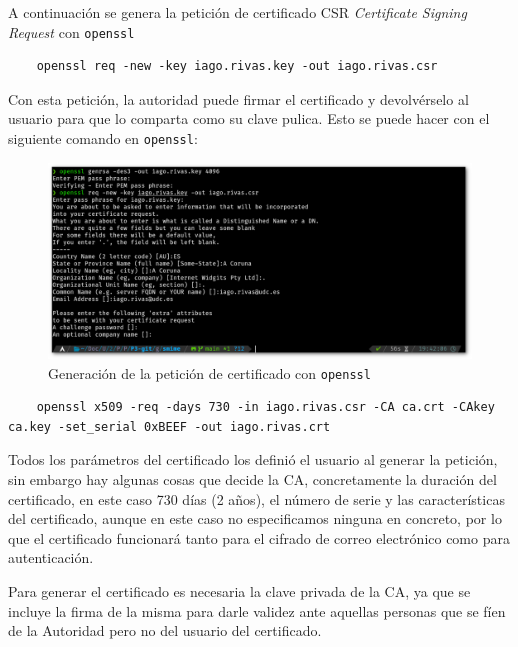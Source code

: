A continuación se genera la petición de certificado CSR \textit{Certificate Signing Request} con \texttt{openssl}

\begin{verbatim}
    openssl req -new -key iago.rivas.key -out iago.rivas.csr
\end{verbatim}

Con esta petición, la autoridad puede firmar el certificado y devolvérselo al usuario para que lo comparta como su clave pulica. Esto se puede hacer con el siguiente comando en \texttt{openssl}:

\begin{figure}[H]
    \centering
    \includegraphics[width=\textwidth]{openssl-key-sombra.png}
    \caption{Generación de la petición de certificado con \texttt{openssl}}
\end{figure}

\begin{verbatim}
    openssl x509 -req -days 730 -in iago.rivas.csr -CA ca.crt -CAkey ca.key -set_serial 0xBEEF -out iago.rivas.crt
\end{verbatim}

Todos los parámetros del certificado los definió el usuario al generar la petición, sin embargo hay algunas cosas que decide la CA, concretamente la duración del certificado, en este caso 730 días (2 años), el número de serie y las características del certificado, aunque en este caso no especificamos ninguna en concreto, por lo que el certificado funcionará tanto para el cifrado de correo electrónico como para autenticación.

Para generar el certificado es necesaria la clave privada de la CA, ya que se incluye la firma de la misma para darle validez ante aquellas personas que se fíen de la Autoridad pero no del usuario del certificado.

